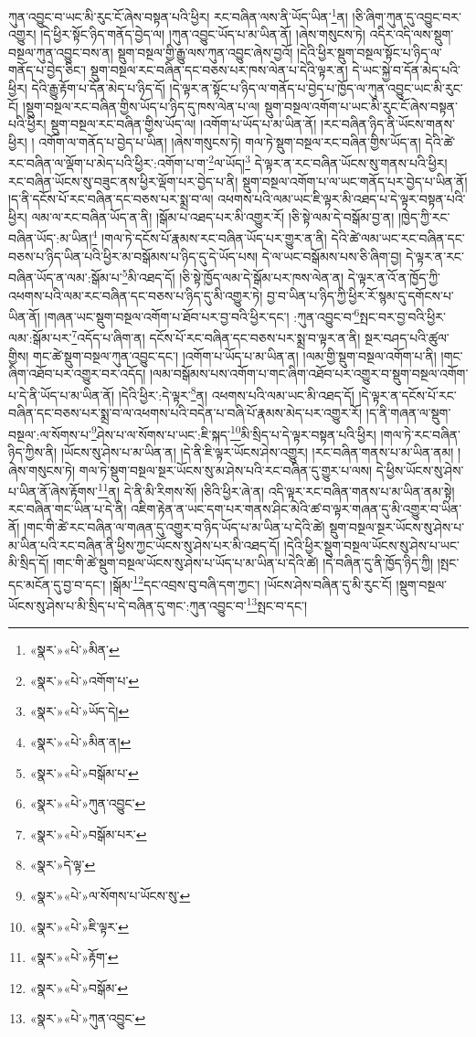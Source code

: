 ཀུན་འབྱུང་བ་ཡང་མི་རུང་ངོ་ཞེས་བསྟན་པའི་ཕྱིར། རང་བཞིན་ལས་ནི་ཡོད་ཡིན་\footnote{«སྣར་»«པེ་»མིན་}ན། །ཅི་ཞིག་ཀུན་དུ་འབྱུང་བར་འགྱུར། །དེ་ཕྱིར་སྟོང་ཉིད་གནོད་བྱེད་ལ། །ཀུན་འབྱུང་ཡོད་པ་མ་ཡིན་ནོ། །ཞེས་གསུངས་ཏེ། འདིར་འདི་ལས་སྡུག་བསྔལ་ཀུན་འབྱུང་བས་ན། སྡུག་བསྔལ་གྱི་རྒྱུ་ལས་ཀུན་འབྱུང་ཞེས་བྱའོ། །དེའི་ཕྱིར་སྡུག་བསྔལ་སྟོང་པ་ཉིད་ལ་གནོད་པ་བྱེད་ཅིང་། སྡུག་བསྔལ་རང་བཞིན་དང་བཅས་པར་ཁས་ལེན་པ་དེའི་ལྟར་ན། དེ་ཡང་སྐྱེ་བ་དོན་མེད་པའི་ཕྱིར། དེའི་རྒྱུ་རྟོག་པ་དོན་མེད་པ་ཉིད་དོ། །དེ་ལྟར་ན་སྟོང་པ་ཉིད་ལ་གནོད་པ་བྱེད་པ་ཁྱོད་ལ་ཀུན་འབྱུང་ཡང་མི་རུང་ངོ། །སྡུག་བསྔལ་རང་བཞིན་གྱིས་ཡོད་པ་ཉིད་དུ་ཁས་ལེན་པ་ལ། སྡུག་བསྔལ་འགོག་པ་ཡང་མི་རུང་ངོ་ཞེས་བསྟན་པའི་ཕྱིར། སྡུག་བསྔལ་རང་བཞིན་གྱིས་ཡོད་ལ། །འགོག་པ་ཡོད་པ་མ་ཡིན་ནོ། །རང་བཞིན་ཉིད་ནི་ཡོངས་གནས་ཕྱིར། །
འགོག་ལ་གནོད་པ་བྱེད་པ་ཡིན། །ཞེས་གསུངས་ཏེ། གལ་ཏེ་སྡུག་བསྔལ་རང་བཞིན་གྱིས་ཡོད་ན། དེའི་ཚེ་རང་བཞིན་ལ་ལྡོག་པ་མེད་པའི་ཕྱིར་:འགོག་པ་ག་\footnote{«སྣར་»«པེ་»འགོག་པ་}ལ་ཡོད།\footnote{«སྣར་»«པེ་»ཡོད་དེ།} དེ་ལྟར་ན་རང་བཞིན་ཡོངས་སུ་གནས་པའི་ཕྱིར། རང་བཞིན་ཡོངས་སུ་བཟུང་ནས་ཕྱིར་ལྡོག་པར་བྱེད་པ་ནི། སྡུག་བསྔལ་འགོག་པ་ལ་ཡང་གནོད་པར་བྱེད་པ་ཡིན་ནོ། །ད་ནི་དངོས་པོ་རང་བཞིན་དང་བཅས་པར་སྨྲ་བ་ལ། འཕགས་པའི་ལམ་ཡང་ཇི་ལྟར་མི་འཐད་པ་དེ་ལྟར་བསྟན་པའི་ཕྱིར། ལམ་ལ་རང་བཞིན་ཡོད་ན་ནི། །སྒོམ་པ་འཐད་པར་མི་འགྱུར་རོ། །ཅི་སྟེ་ལམ་དེ་བསྒོམ་བྱ་ན། །ཁྱེད་ཀྱི་རང་བཞིན་ཡོད་:མ་ཡིན།\footnote{«སྣར་»«པེ་»མིན་ན།} །གལ་ཏེ་དངོས་པོ་རྣམས་རང་བཞིན་ཡོད་པར་གྱུར་ན་ནི། དེའི་ཚེ་ལམ་ཡང་རང་བཞིན་དང་བཅས་པ་ཉིད་ཡིན་པའི་ཕྱིར་མ་བསྒོམས་པ་ཉིད་དུ་དེ་ཡོད་པས། དེ་ལ་ཡང་བསྒོམས་པས་ཅི་ཞིག་བྱ། དེ་ལྟར་ན་རང་བཞིན་ཡོད་ན་ལམ་:སྒོམ་པ་\footnote{«སྣར་»«པེ་»བསྒོམ་པ་}མི་འཐད་དོ། །ཅི་སྟེ་ཁྱོད་ལམ་དེ་སྒོམ་པར་ཁས་ལེན་ན། དེ་ལྟར་ན་འོ་ན་ཁྱོད་ཀྱི་འཕགས་པའི་ལམ་རང་བཞིན་དང་བཅས་པ་ཉིད་དུ་མི་འགྱུར་ཏེ། བྱ་བ་ཡིན་པ་ཉིད་ཀྱི་ཕྱིར་རོ་སྙམ་དུ་དགོངས་པ་ཡིན་ནོ། །གཞན་ཡང་སྡུག་བསྔལ་འགོག་པ་ཐོབ་པར་བྱ་བའི་ཕྱིར་དང་། :ཀུན་འབྱུང་བ་\footnote{«སྣར་»«པེ་»ཀུན་འབྱུང་}སྤང་བར་བྱ་བའི་ཕྱིར་ལམ་:སྒོམ་པར་\footnote{«སྣར་»«པེ་»བསྒོམ་པར་}འདོད་པ་ཞིག་ན། དངོས་པོ་རང་བཞིན་དང་བཅས་པར་སྨྲ་བ་ལྟར་ན་ནི། སྔར་བཤད་པའི་ཚུལ་གྱིས། གང་ཚེ་སྡུག་བསྔལ་ཀུན་འབྱུང་དང་། །འགོག་པ་ཡོད་པ་མ་ཡིན་ན། །ལམ་གྱི་སྡུག་བསྔལ་འགོག་པ་ནི། །གང་ཞིག་འཐོབ་པར་འགྱུར་བར་འདོད། །ལམ་བསྒོམས་པས་འགོག་པ་གང་ཞིག་འཐོབ་པར་འགྱུར་བ་སྡུག་བསྔལ་འགོག་པ་དེ་ནི་ཡོད་པ་མ་ཡིན་ནོ། །དེའི་ཕྱིར་:དེ་ལྟར་\footnote{«སྣར་»དེ་ལྟ་}ན། འཕགས་པའི་ལམ་ཡང་མི་འཐད་དོ། །དེ་ལྟར་ན་དངོས་པོ་རང་བཞིན་དང་བཅས་པར་སྨྲ་བ་ལ་འཕགས་པའི་བདེན་པ་བཞི་པོ་རྣམས་མེད་པར་འགྱུར་རོ། །ད་ནི་གཞན་ལ་སྡུག་བསྔལ་:ལ་སོགས་པ་\footnote{«སྣར་»«པེ་»ལ་སོགས་པ་ཡོངས་སུ་}ཤེས་པ་ལ་སོགས་པ་ཡང་:ཇི་སྐད་\footnote{«སྣར་»«པེ་»ཇི་ལྟར་}མི་སྲིད་པ་དེ་ལྟར་བསྟན་པའི་ཕྱིར། །གལ་ཏེ་རང་བཞིན་ཉིད་ཀྱིས་ནི། །ཡོངས་སུ་ཤེས་པ་མ་ཡིན་ན། །དེ་ནི་ཇི་ལྟར་ཡོངས་ཤེས་འགྱུར། །རང་བཞིན་གནས་པ་མ་ཡིན་ནམ། །ཞེས་གསུངས་ཏེ། གལ་ཏེ་སྡུག་བསྔལ་སྔར་ཡོངས་སུ་མ་ཤེས་པའི་རང་བཞིན་དུ་གྱུར་པ་ལས། དེ་ཕྱིས་ཡོངས་སུ་ཤེས་པ་ཡིན་ནོ་ཞེས་རྟོགས་\footnote{«སྣར་»«པེ་»རྟོག་}ན། དེ་ནི་མི་རིགས་སོ། །ཅིའི་ཕྱིར་ཞེ་ན། འདི་ལྟར་རང་བཞིན་གནས་པ་མ་ཡིན་ནམ་སྟེ། རང་བཞིན་གང་ཡིན་པ་དེ་ནི། འཇིག་རྟེན་ན་ཡང་དག་པར་གནས་ཤིང་མེའི་ཚ་བ་ལྟར་གཞན་དུ་མི་འགྱུར་བ་ཡིན་ནོ། །གང་གི་ཚེ་རང་བཞིན་ལ་གཞན་དུ་འགྱུར་བ་ཉིད་ཡོད་པ་མ་ཡིན་པ་དེའི་ཚེ། སྡུག་བསྔལ་སྔར་ཡོངས་སུ་ཤེས་པ་མ་ཡིན་པའི་རང་བཞིན་ནི་ཕྱིས་ཀྱང་ཡོངས་སུ་ཤེས་པར་མི་འཐད་དོ། །དེའི་ཕྱིར་སྡུག་བསྔལ་ཡོངས་སུ་ཤེས་པ་ཡང་མི་སྲིད་དོ། །གང་གི་ཚེ་སྡུག་བསྔལ་ཡོངས་སུ་ཤེས་པ་ཡོད་པ་མ་ཡིན་པ་དེའི་ཚེ། །དེ་བཞིན་དུ་ནི་ཁྱོད་ཉིད་ཀྱི། །སྤང་དང་མངོན་དུ་བྱ་བ་དང་། །སྒོམ་\footnote{«སྣར་»«པེ་»བསྒོམ་}དང་འབྲས་བུ་བཞི་དག་ཀྱང་། །ཡོངས་ཤེས་བཞིན་དུ་མི་རུང་ངོ། །སྡུག་བསྔལ་ཡོངས་སུ་ཤེས་པ་མི་སྲིད་པ་དེ་བཞིན་དུ་གང་:ཀུན་འབྱུང་བ་\footnote{«སྣར་»«པེ་»ཀུན་འབྱུང་}སྤང་བ་དང་། 